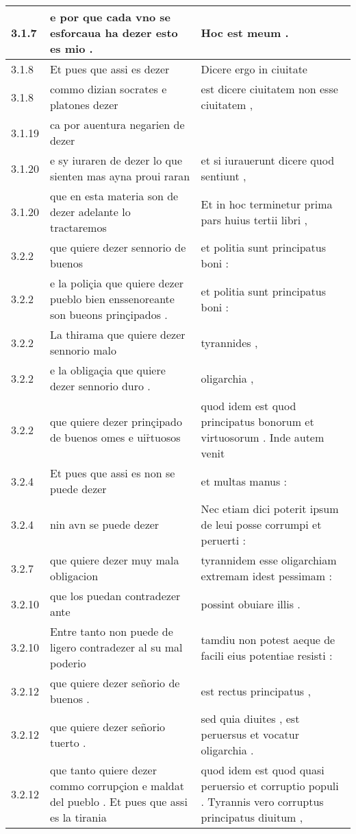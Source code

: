 \begin{tabular}{|p{1cm}|p{6.5cm}|p{6.5cm}|}
3.1.7 & e por que cada vno se esforcaua ha dezer esto es mio . & Hoc est meum . \\\hline
3.1.8 & Et pues que assi es dezer & Dicere ergo in ciuitate \\\hline
3.1.8 & commo dizian socrates e platones dezer & est dicere ciuitatem non esse ciuitatem , \\\hline
3.1.19 & ca por auentura negarien de dezer &  \\\hline
3.1.20 & e sy iuraren de dezer lo que sienten mas ayna proui raran & et si iurauerunt dicere quod sentiunt , \\\hline
3.1.20 & que en esta materia son de dezer adelante lo tractaremos & Et in hoc terminetur prima pars huius tertii libri , \\\hline
3.2.2 & que quiere dezer sennorio de buenos & et politia sunt principatus boni : \\\hline
3.2.2 & e la poliçia que quiere dezer pueblo bien enssenoreante son bueons prinçipados . & et politia sunt principatus boni : \\\hline
3.2.2 & La thirama que quiere dezer sennorio malo & tyrannides , \\\hline
3.2.2 & e la obligaçia que quiere dezer sennorio duro . & oligarchia , \\\hline
3.2.2 & que quiere dezer prinçipado de buenos omes e uir̉tuosos & quod idem est quod principatus bonorum et virtuosorum . Inde autem venit \\\hline
3.2.4 & Et pues que assi es non se puede dezer & et multas manus : \\\hline
3.2.4 & nin avn se puede dezer & Nec etiam dici poterit ipsum de leui posse corrumpi et peruerti : \\\hline
3.2.7 & que quiere dezer muy mala obligacion & tyrannidem esse oligarchiam extremam idest pessimam : \\\hline
3.2.10 & que los puedan contradezer ante & possint obuiare illis . \\\hline
3.2.10 & Entre tanto non puede de ligero contradezer al su mal poderio & tamdiu non potest aeque de facili eius potentiae resisti : \\\hline
3.2.12 & que quiere dezer señorio de buenos . & est rectus principatus , \\\hline
3.2.12 & que quiere dezer señorio tuerto . & sed quia diuites , est peruersus et vocatur oligarchia . \\\hline
3.2.12 & que tanto quiere dezer commo corrupçion e maldat del pueblo . Et pues que assi es la tirania & quod idem est quod quasi peruersio et corruptio populi . Tyrannis vero corruptus principatus diuitum , \\\hline

\end{tabular}

